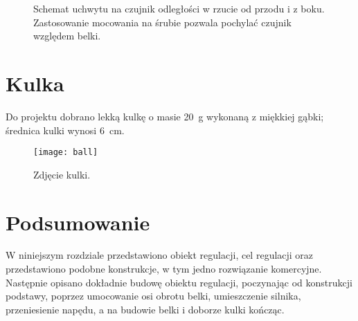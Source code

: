 \begin{figure}[H]
    \centering
    
    \caption{Schemat uchwytu na czujnik odległości w rzucie od przodu i z boku. Zastosowanie mocowania na śrubie pozwala pochylać czujnik względem belki.}
    \label{fig:uchwyt_czujnika_odleglosci}
\end{figure}

\section{Kulka}

Do projektu dobrano lekką kulkę o masie \SI{20}{g} wykonaną z miękkiej gąbki; średnica kulki wynosi \SI{6}{cm}.

\begin{figure}[H]
    \centering
    \texttt{[image: ball]}
    \caption{Zdjęcie kulki.}
    \label{fig:kulka}
\end{figure}

\section{Podsumowanie}

W niniejszym rozdziale przedstawiono obiekt regulacji, cel regulacji oraz przedstawiono podobne konstrukcje, w tym jedno rozwiązanie komercyjne. Następnie opisano dokładnie budowę obiektu regulacji, poczynając od konstrukcji podstawy, poprzez umocowanie osi obrotu belki, umieszczenie silnika, przeniesienie napędu, a na budowie belki i doborze kulki kończąc.

